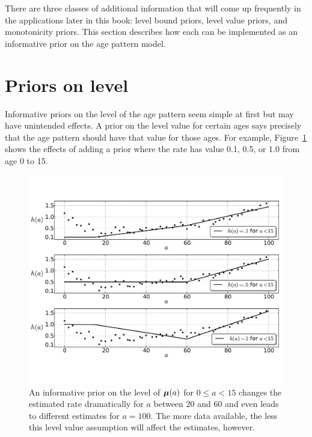 There are three classes of additional information that will come up
frequently in the applications later in this book: level bound priors,
level value priors, and monotonicity priors. This section describes
how each can be implemented as an informative prior on the age pattern
model.


\section{Priors on level}

Informative priors on the level of the age pattern seem simple at
first but may have unintended effects.  A prior on the level value
for certain ages says precisely that the age pattern should have that
value for those ages.  For example, Figure~\ref{level-value-priors} shows
the effects of adding a prior where the rate has value 0.1, 0.5, or 1.0
from age 0 to 15.


\begin{figure}[h]
\begin{center}
\includegraphics[width=\textwidth]{level_value-smoothing-splines.pdf}
\caption{An informative prior on the level of
$\boldsymbol{\mu}(a)$ for $0 \leq a < 15$ changes the estimated rate dramatically
for $a$ between $20$ and $60$ and even leads to different estimates
for $a = 100$.  The more data available, the less this level value
assumption will affect the estimates, however.
}
\label{level-value-priors}
\end{center}
\end{figure}



